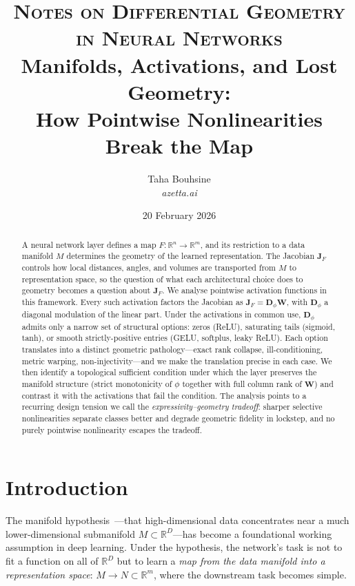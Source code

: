 \documentclass[11pt,a4paper]{article}
\title{%
  \vspace{-1cm}
  {\Large\scshape Notes on Differential Geometry in Neural Networks}\\[0.6em]
  \textbf{Manifolds, Activations, and Lost Geometry:\\
  How Pointwise Nonlinearities Break the Map}
}
\author{Taha Bouhsine\\[0.3em]{\normalsize\textit{azetta.ai}}}
\date{20 February 2026}
\theoremstyle{remark}
\begin{document}
\maketitle

\begin{abstract}
A neural network layer defines a map $F: \mathbb{R}^n \to \mathbb{R}^m$, and its restriction to a data manifold $M$ determines the geometry of the learned representation.
The Jacobian $\mathbf{J}_F$ controls how local distances, angles, and volumes are transported from $M$ to representation space, so the question of what each architectural choice does to geometry becomes a question about $\mathbf{J}_F$.
We analyse pointwise activation functions in this framework.
Every such activation factors the Jacobian as $\mathbf{J}_F = \mathbf{D}_\phi \mathbf{W}$, with $\mathbf{D}_\phi$ a diagonal modulation of the linear part.
Under the activations in common use, $\mathbf{D}_\phi$ admits only a narrow set of structural options: zeros (ReLU), saturating tails (sigmoid, tanh), or smooth strictly-positive entries (GELU, softplus, leaky ReLU).
Each option translates into a distinct geometric pathology---exact rank collapse, ill-conditioning, metric warping, non-injectivity---and we make the translation precise in each case.
We then identify a topological sufficient condition under which the layer preserves the manifold structure (strict monotonicity of $\phi$ together with full column rank of $\mathbf{W}$) and contrast it with the activations that fail the condition.
The analysis points to a recurring design tension we call the \emph{expressivity--geometry tradeoff}: sharper selective nonlinearities separate classes better and degrade geometric fidelity in lockstep, and no purely pointwise nonlinearity escapes the tradeoff.
\end{abstract}

\section{Introduction}
\label{sec:intro}

The manifold hypothesis~\cite{bengio2013manifold}---that high-dimensional data concentrates near a much lower-dimensional submanifold $M \subset \mathbb{R}^D$---has become a foundational working assumption in deep learning.
Under the hypothesis, the network's task is not to fit a function on all of $\mathbb{R}^D$ but to learn a \emph{map from the data manifold into a representation space}: $M \to N \subset \mathbb{R}^m$, where the downstream task becomes simple.
\end{document}
